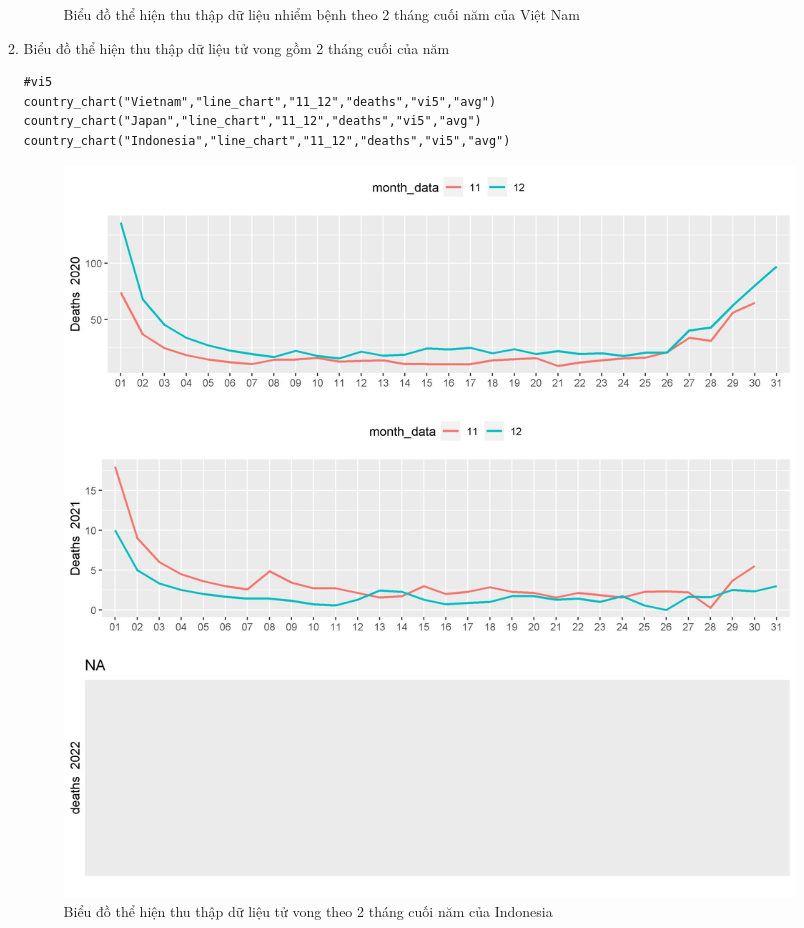 \documentclass[a4paper]{article}
\theoremstyle{definition}
\begin{document}
\begin{enumerate}[i)]
\begin{enumerate}[1)]
\begin{figure}[htp]
		    \caption{Biểu đồ thể hiện thu thập dữ liệu nhiểm bệnh theo 2 tháng cuối năm của Việt Nam}
		    \label{fig:my_label}
		 \end{figure}
		 \newpage
    \item Biểu đồ thể hiện thu thập dữ liệu tử vong gồm 2 tháng cuối của năm
    \begin{lstlisting}[frame=single]  
#vi5
country_chart("Vietnam","line_chart","11_12","deaths","vi5","avg")
country_chart("Japan","line_chart","11_12","deaths","vi5","avg")
country_chart("Indonesia","line_chart","11_12","deaths","vi5","avg")
		\end{lstlisting}
		\begin{figure}[htp]
		    \centering
		    \includegraphics[scale = 0.7]{Images/VI/vi5 Indonesia .jpeg}
		    \caption{Biểu đồ thể hiện thu thập dữ liệu tử vong theo 2 tháng cuối năm của Indonesia}
		    \label{fig:my_label}
		\end{figure}
		\begin{figure}[htp]
		    \centering

\end{figure}
\end{enumerate}
\end{enumerate}
\end{document}
